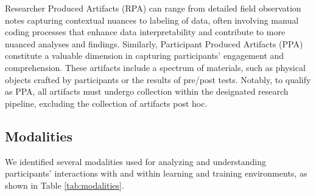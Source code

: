 \documentclass[manuscript,screen,review]{acmart}
\begin{document}
Researcher Produced Artifacts (RPA) can range from detailed field observation notes capturing contextual nuances to labeling of data, often involving manual coding processes that enhance data interpretability and contribute to more nuanced analyses and findings. Similarly, Participant Produced Artifacts (PPA) constitute a valuable dimension in capturing participants' engagement and comprehension. These artifacts include a spectrum of materials, such as physical objects crafted by participants or the results of pre/post tests. Notably, to qualify as PPA, all artifacts must undergo collection within the designated research pipeline, excluding the collection of artifacts post hoc. 

\subsection{Modalities} \label{sec:modalities}

We identified several modalities used for analyzing and understanding participants' interactions with and within learning and training environments, as shown in Table \ref{tab:modalities}. 
\end{document}
